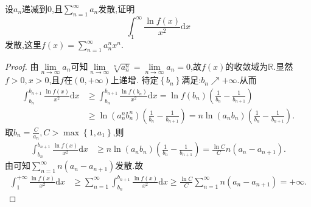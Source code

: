 \documentclass[../../main.tex]{subfiles}
\begin{document}
\begin{example}
设$a_n$递减到$0$,且$\sum\limits_{n=1}^\infty a_n$发散,证明
$$\int_1^\infty \frac{\ln f(x)}{x^2}\mathrm{d}x$$
发散,这里$f(x)=\sum\limits_{n=1}^\infty a_n^n x^n$.
\end{example}
\begin{proof}
由$\lim\limits_{n\rightarrow \infty}a_n$可知$\lim\limits_{n\rightarrow \infty}\sqrt[n]{a_{n}^{n}}=\lim\limits_{n\rightarrow \infty}a_n=0$,故$f\left( x \right)$的收敛域为$\mathbb{R}$.显然$f>0,x>0$,且$f$在$\left( 0,+\infty \right)$上递增.
待定$\left\{ b_n \right\}$满足:$b_n\nearrow +\infty$.从而
\begin{align*}
\int_{b_n}^{b_{n+1}}{\frac{\ln f\left( x \right)}{x^2}\mathrm{d}x}&\geqslant \int_{b_n}^{b_{n+1}}{\frac{\ln f\left( b_n \right)}{x^2}\mathrm{d}x}=\ln f\left( b_n \right) \left( \frac{1}{b_n}-\frac{1}{b_{n+1}} \right) \\
&\geqslant \ln \left( a_{n}^{n}b_{n}^{n} \right) \left( \frac{1}{b_n}-\frac{1}{b_{n+1}} \right) =n\ln \left( a_nb_n \right) \left( \frac{1}{b_n}-\frac{1}{b_{n+1}} \right) .
\end{align*}
取$b_n=\frac{C}{a_n},C>\max \left\{ 1,a_1 \right\}$,则
\begin{align*}
\int_{b_n}^{b_{n+1}}{\frac{\ln f\left( x \right)}{x^2}\mathrm{d}x}&\geqslant n\ln \left( a_nb_n \right) \left( \frac{1}{b_n}-\frac{1}{b_{n+1}} \right) =\frac{\ln C}{C}n\left( a_n-a_{n+1} \right) .
\end{align*}
由可知$\sum_{n=1}^{\infty}{n\left( a_n-a_{n+1} \right)}$发散.故
\begin{align*}
\int_1^{+\infty}{\frac{\ln f\left( x \right)}{x^2}\mathrm{d}x}&\geqslant \sum_{n=1}^{\infty}{\int_{b_n}^{b_{n+1}}{\frac{\ln f\left( x \right)}{x^2}\mathrm{d}x}}\geqslant \frac{\ln C}{C}\sum_{n=1}^{\infty}{n\left( a_n-a_{n+1} \right)}=+\infty .
\end{align*}
\end{proof}
\end{document}
